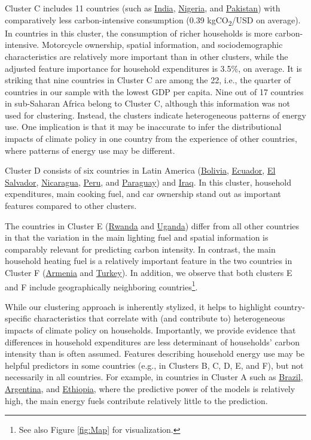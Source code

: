 \documentclass[12pt, a4paper]{article}
\begin{document}
Cluster C includes 11 countries (such as \hyperref[fig:5b_IND]{India}, \hyperref[fig:5b_NGA]{Nigeria}, and \hyperref[fig:5b_PAK]{Pakistan}) with comparatively less carbon-intensive consumption (0.39 kgCO\textsubscript{2}/USD on average). In countries in this cluster, the consumption of richer households is more carbon-intensive. Motorcycle ownership, spatial information, and sociodemographic characteristics are relatively more important than in other clusters, while the adjusted feature importance for household expenditures is 3.5\%, on average. It is striking that nine countries in Cluster C are among the 22, i.e., the quarter of countries in our sample with the lowest GDP per capita. Nine out of 17 countries in sub-Saharan Africa belong to Cluster C, although this information was not used for clustering. Instead, the clusters indicate heterogeneous patterns of energy use. One implication is that it may be inaccurate to infer the distributional impacts of climate policy in one country from the experience of other countries, where patterns of energy use may be different.

Cluster D consists of six countries in Latin America (\hyperref[fig:5b_BOL]{Bolivia}, \hyperref[fig:5b_ECU]{Ecuador}, \hyperref[fig:5b_SLV]{El Salvador}, \hyperref[fig:5b_NIC]{Nicaragua}, \hyperref[fig:5b_PER]{Peru}, and \hyperref[fig:5b_PRY]{Paraguay}) and \hyperref[fig:5b_IRQ]{Iraq}. In this cluster, household expenditures, main cooking fuel, and car ownership stand out as important features compared to other clusters. 

The countries in Cluster E (\hyperref[fig:5b_RWA]{Rwanda} and \hyperref[fig:5b_UGA]{Uganda}) differ from all other countries in that the variation in the main lighting fuel and spatial information is comparably relevant for predicting carbon intensity. In contrast, the main household heating fuel is a relatively important feature in the two countries in Cluster F (\hyperref[fig:5b_ARM]{Armenia} and \hyperref[fig:5b_TUR]{Turkey}). In addition, we observe that both clusters E and F include geographically neighboring countries\footnote{See also Figure \ref{fig:Map} for visualization.}.

While our clustering approach is inherently stylized, it helps to highlight country-specific characteristics that correlate with (and contribute to) heterogeneous impacts of climate policy on households. Importantly, we provide evidence that differences in household expenditures are less determinant of households' carbon intensity than is often assumed. Features describing household energy use may be helpful predictors in some countries (e.g., in Clusters B, C, D, E, and F), but not necessarily in all countries. For example, in countries in Cluster A such as \hyperref[fig:5b_BRA]{Brazil}, \hyperref[fig:5b_URY]{Argentina}, and \hyperref[fig:5b_ETH]{Ethiopia}, where the predictive power of the models is relatively high, the main energy fuels contribute relatively little to the prediction.
\end{document}
